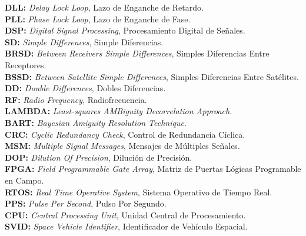 \documentclass[a4paper,12pt,oneside,onecolumn,final,openright]{book}%
\begin{document}
\textbf{DLL:} \textit{Delay Lock Loop}, Lazo de Enganche de Retardo.\\
\textbf{PLL:} \textit{Phase Lock Loop}, Lazo de Enganche de Fase.\\
\textbf{DSP:} \textit{Digital Signal Processing}, Procesamiento Digital de Señales.\\
\textbf{SD:} \textit{Simple Differences}, Simple Diferencias.\\
\textbf{BRSD:} \textit{Between Receivers Simple Differences}, Simples Diferencias Entre Receptores.\\
\textbf{BSSD:} \textit{Between Satellite Simple Differences}, Simples Diferencias Entre Satélites.\\
\textbf{DD:} \textit{Double Differences}, Dobles Diferencias.\\
\textbf{RF:} \textit{Radio Frequency}, Radiofrecuencia.\\
\textbf{LAMBDA:} \textit{Least-squares AMBiguity Decorrelation Approach}.\\
\textbf{BART:} \textit{Bayesian Amiguity Resolution Technique}.\\
\textbf{CRC:} \textit{Cyclic Redundancy Check}, Control de Redundancia Cíclica.\\
\textbf{MSM:} \textit{Multiple Signal Messages}, Mensajes de Múltiples Señales.\\
\textbf{DOP:} \textit{Dilution Of Precision}, Dilución de Precisión.\\
\textbf{FPGA:} \textit{Field Programmable Gate Array}, Matriz de Puertas Lógicas Programable en Campo.\\
\textbf{RTOS:} \textit{Real Time Operative System}, Sistema Operativo de Tiempo Real.\\
\textbf{PPS:} \textit{Pulse Per Second}, Pulso Por Segundo.\\
\textbf{CPU:} \textit{Central Processing Unit}, Unidad Central de Procesamiento.\\
\textbf{SVID:} \textit{Space Vehicle Identifier}, Identificador de Vehículo Espacial.\\

\newpage

\listoffigures


\end{document}
